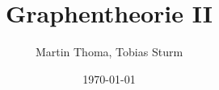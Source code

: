 \documentclass[hyperref={pdfpagelabels=false}]{beamer}
\begin{document}
\title{Graphentheorie II}   
\author{Martin Thoma, Tobias Sturm} 
\date{\today} 
\subject{Graphentheorie-Referat fur ICPC}

\frame{\titlepage} 


\end{document}
